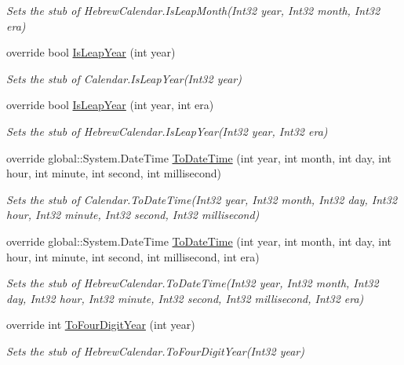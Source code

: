 \begin{DoxyCompactItemize}
\begin{DoxyCompactList}\small\item\em Sets the stub of Hebrew\-Calendar.\-Is\-Leap\-Month(\-Int32 year, Int32 month, Int32 era)\end{DoxyCompactList}\item 
override bool \hyperlink{class_system_1_1_globalization_1_1_fakes_1_1_stub_hebrew_calendar_a3a0f643f19c68df7e6b1e87a4bc1d40b}{Is\-Leap\-Year} (int year)
\begin{DoxyCompactList}\small\item\em Sets the stub of Calendar.\-Is\-Leap\-Year(\-Int32 year)\end{DoxyCompactList}\item 
override bool \hyperlink{class_system_1_1_globalization_1_1_fakes_1_1_stub_hebrew_calendar_acf653de33a4bcd3d1cfc8a5cfb4fe548}{Is\-Leap\-Year} (int year, int era)
\begin{DoxyCompactList}\small\item\em Sets the stub of Hebrew\-Calendar.\-Is\-Leap\-Year(\-Int32 year, Int32 era)\end{DoxyCompactList}\item 
override global\-::\-System.\-Date\-Time \hyperlink{class_system_1_1_globalization_1_1_fakes_1_1_stub_hebrew_calendar_a94f536a95f34619d90d49266624c8b64}{To\-Date\-Time} (int year, int month, int day, int hour, int minute, int second, int millisecond)
\begin{DoxyCompactList}\small\item\em Sets the stub of Calendar.\-To\-Date\-Time(\-Int32 year, Int32 month, Int32 day, Int32 hour, Int32 minute, Int32 second, Int32 millisecond)\end{DoxyCompactList}\item 
override global\-::\-System.\-Date\-Time \hyperlink{class_system_1_1_globalization_1_1_fakes_1_1_stub_hebrew_calendar_a038b7edf2e02b7d4945b644e01c24770}{To\-Date\-Time} (int year, int month, int day, int hour, int minute, int second, int millisecond, int era)
\begin{DoxyCompactList}\small\item\em Sets the stub of Hebrew\-Calendar.\-To\-Date\-Time(\-Int32 year, Int32 month, Int32 day, Int32 hour, Int32 minute, Int32 second, Int32 millisecond, Int32 era)\end{DoxyCompactList}\item 
override int \hyperlink{class_system_1_1_globalization_1_1_fakes_1_1_stub_hebrew_calendar_a16cc75d03c0ac98568c9a3cf2306eed6}{To\-Four\-Digit\-Year} (int year)
\begin{DoxyCompactList}\small\item\em Sets the stub of Hebrew\-Calendar.\-To\-Four\-Digit\-Year(\-Int32 year)\end{DoxyCompactList}\end{DoxyCompactItemize}
